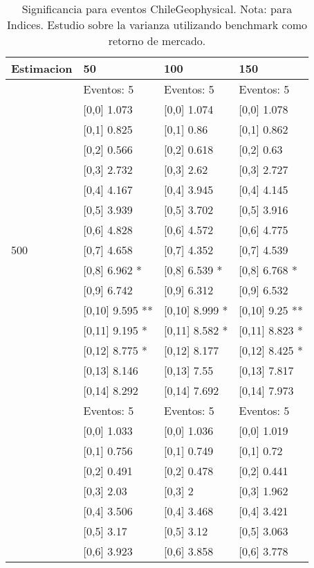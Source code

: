 \begin{table}

\caption{Significancia para eventos ChileGeophysical. Nota: para Indices. Estudio sobre la varianza utilizando benchmark como retorno de mercado.}
\centering
\begin{tabular}[t]{llll}
\toprule
Estimacion & 50 & 100 & 150\\
\midrule
 & Eventos:  5 & Eventos:  5 & Eventos:  5\\
 & {}[0,0] 1.073 & {}[0,0] 1.074 & {}[0,0] 1.078\\
 & {}[0,1] 0.825 & {}[0,1] 0.86 & {}[0,1] 0.862\\
 & {}[0,2] 0.566 & {}[0,2] 0.618 & {}[0,2] 0.63\\
 & {}[0,3] 2.732 & {}[0,3] 2.62 & {}[0,3] 2.727\\
\addlinespace
 & {}[0,4] 4.167 & {}[0,4] 3.945 & {}[0,4] 4.145\\
 & {}[0,5] 3.939 & {}[0,5] 3.702 & {}[0,5] 3.916\\
 & {}[0,6] 4.828 & {}[0,6] 4.572 & {}[0,6] 4.775\\
500 & {}[0,7] 4.658 & {}[0,7] 4.352 & {}[0,7] 4.539\\
 & {}[0,8] 6.962 * & {}[0,8] 6.539 * & {}[0,8] 6.768 *\\
\addlinespace
 & {}[0,9] 6.742 & {}[0,9] 6.312 & {}[0,9] 6.532\\
 & {}[0,10] 9.595 ** & {}[0,10] 8.999 * & {}[0,10] 9.25 **\\
 & {}[0,11] 9.195 * & {}[0,11] 8.582 * & {}[0,11] 8.823 *\\
 & {}[0,12] 8.775 * & {}[0,12] 8.177 & {}[0,12] 8.425 *\\
 & {}[0,13] 8.146 & {}[0,13] 7.55 & {}[0,13] 7.817\\
\addlinespace
 & {}[0,14] 8.292 & {}[0,14] 7.692 & {}[0,14] 7.973\\
 & Eventos:  5 & Eventos:  5 & Eventos:  5\\
 & {}[0,0] 1.033 & {}[0,0] 1.036 & {}[0,0] 1.019\\
 & {}[0,1] 0.756 & {}[0,1] 0.749 & {}[0,1] 0.72\\
 & {}[0,2] 0.491 & {}[0,2] 0.478 & {}[0,2] 0.441\\
\addlinespace
 & {}[0,3] 2.03 & {}[0,3] 2 & {}[0,3] 1.962\\
 & {}[0,4] 3.506 & {}[0,4] 3.468 & {}[0,4] 3.421\\
 & {}[0,5] 3.17 & {}[0,5] 3.12 & {}[0,5] 3.063\\
 & {}[0,6] 3.923 & {}[0,6] 3.858 & {}[0,6] 3.778\\

\end{tabular}
\end{table}
